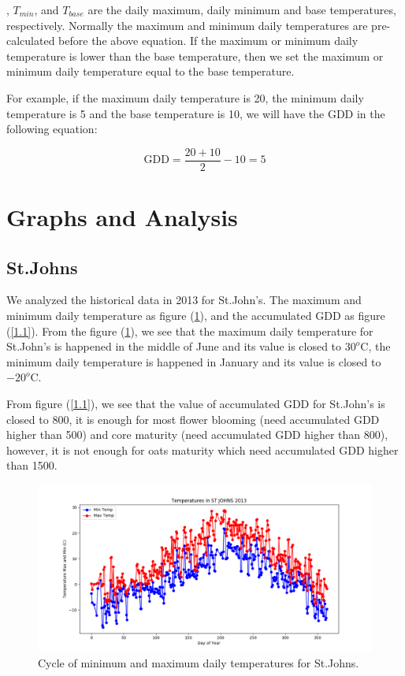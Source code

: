 \documentclass[12pt]{article}
\begin{document}
, {$T_{min}$}, and {$T_{base}$} are the daily maximum, daily minimum and base temperatures, respectively. Normally the maximum and minimum daily temperatures are pre-calculated before the above equation. If the maximum or minimum daily temperature is lower than the base temperature, then we set the maximum or minimum daily temperature equal to the base temperature.

For example, if the maximum daily temperature is 20, the minimum daily temperature is 5 and the base temperature is 10, we will have the GDD in the following equation:

\begin{equation}
\textrm{GDD} =\frac{20+10}{2}- 10=5
\end{equation}


\section{Graphs and Analysis}
\subsection{ \bf St.Johns }

We analyzed the historical data in 2013 for St.John's. The maximum and minimum daily temperature as figure (\ref{1}), and the accumulated GDD as figure (\ref{1.1}). From the figure (\ref{1}), we see that the maximum daily temperature for St.John's is happened in the middle of June and its value is closed to $30^{o}$C, the minimum daily temperature is happened in January and its value is closed to $-20^{o}$C.

From figure (\ref{1.1}), we see that the value of accumulated GDD for St.John's is closed to 800, it is enough for most flower blooming (need accumulated GDD higher than 500) and core maturity (need accumulated GDD higher than 800), however, it is not enough for oats maturity which need accumulated GDD higher than 1500.




\begin{figure}[H]
\begin{center}
\includegraphics[width=5.25in]{Plot/St.Johns/day_vs_temp_2013.png}

\caption{Cycle of minimum and maximum daily temperatures for St.Johns.}
\label{1}
\end{center}





\end{figure}
\end{document}
